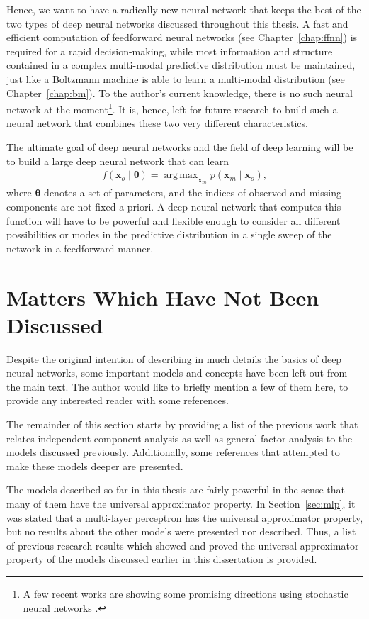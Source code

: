 \documentclass[dissertation,nocontribution,draft*]{aaltoseries}
\newcommand{\vect}[1]{\mathbf{#1}}
\newcommand{\vects}[1]{\boldsymbol{#1}}
\newcommand{\vx}[0]{\vect{x}}
\newcommand{\TT}[0]{{\vects{\theta}}}
\DeclareMathOperator*{\argmax}{arg\,max}
\begin{document}
Hence, we want to have a radically new neural network that
keeps the best of the two types of deep neural networks
discussed throughout this thesis. A fast and efficient
computation of feedforward neural networks (see
Chapter~\ref{chap:ffnn}) is required for a rapid
decision-making, while most information and structure
contained in a complex multi-modal predictive distribution
must be maintained, just like a Boltzmann machine is able to
learn a multi-modal distribution (see
Chapter~\ref{chap:bm}). To the author's current knowledge,
there is no such neural network at the moment\footnote{
A few recent works are showing some promising directions using
stochastic neural networks \citet[see,
e.g.,][]{Bengio2013gsn,Tang2013}.  }. It is, hence, left for
future research to build such a neural network that combines these
two very different characteristics.

The ultimate goal of deep neural networks and the field of
deep learning will be to build a large deep neural network
that can learn
\begin{align*}
    f(\vx_o\mid \TT) = \argmax_{\vx_m} p(\vx_m \mid \vx_o),
\end{align*}
where $\TT$ denotes a set of parameters, and the indices of
observed and missing components are not fixed a priori. A
deep neural network that computes this function will have to
be powerful and flexible enough to consider all different
possibilities or modes in the predictive distribution in a
single sweep of the network in a feedforward manner.



\section{Matters Which Have Not Been Discussed}
\label{sec:leftovers}

Despite the original intention of describing in much
details the basics of deep neural networks,
some important models and concepts have been left out from
the main text. The author would like to briefly mention
a few of them here, to provide any interested reader with
some references.

The remainder of this section starts by providing a list of
the previous work that relates independent component
analysis as well as general factor analysis to the models
discussed previously.  Additionally, some references that
attempted to make these models deeper are presented.  

The models described so far in this thesis are fairly
powerful in the sense that many of them have the universal
approximator property. In Section~\ref{sec:mlp}, it was
stated that a multi-layer perceptron has the universal
approximator property, but no results about the other models
were presented nor described. Thus, a list of previous
research results which showed and proved the universal approximator
property of the models discussed earlier in this
dissertation is provided.
\end{document}
